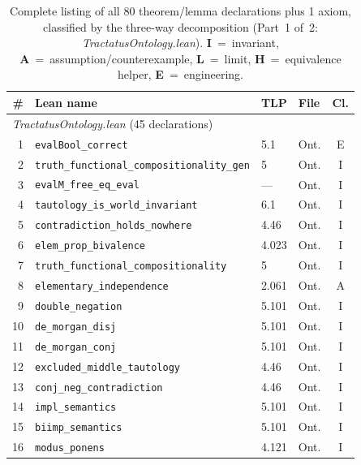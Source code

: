 \documentclass[jsl,bibother]{asl}
\theoremstyle{definition}
\theoremstyle{remark}
\begin{document}
\begin{table}[p]
\centering
\footnotesize
\caption{Complete listing of all 80 theorem/lemma declarations
  plus 1 axiom, classified by the three-way decomposition
  (Part~1 of~2: \emph{TractatusOntology.lean}).
  \textbf{I}~=~invariant, \textbf{A}~=~assumption/counterexample,
  \textbf{L}~=~limit, \textbf{H}~=~equivalence helper,
  \textbf{E}~=~engineering.}
\label{tab:decomposition}
\begin{tabular}{@{}rlllc@{}}
\toprule
\# & \textbf{Lean name} & \textbf{TLP} & \textbf{File} & \textbf{Cl.} \\
\midrule
\multicolumn{5}{l}{\emph{TractatusOntology.lean} (45 declarations)} \\
\midrule
 1 & \texttt{evalBool\_correct}                        & 5.1     & Ont. & E \\
 2 & \texttt{truth\_functional\_compositionality\_gen}  & 5       & Ont. & I \\
 3 & \texttt{evalM\_free\_eq\_eval}                     & ---     & Ont. & I \\
 4 & \texttt{tautology\_is\_world\_invariant}            & 6.1     & Ont. & I \\
 5 & \texttt{contradiction\_holds\_nowhere}              & 4.46    & Ont. & I \\
 6 & \texttt{elem\_prop\_bivalence}                      & 4.023   & Ont. & I \\
 7 & \texttt{truth\_functional\_compositionality}        & 5       & Ont. & I \\
 8 & \texttt{elementary\_independence}                   & 2.061   & Ont. & A \\
 9 & \texttt{double\_negation}                           & 5.101   & Ont. & I \\
10 & \texttt{de\_morgan\_disj}                           & 5.101   & Ont. & I \\
11 & \texttt{de\_morgan\_conj}                           & 5.101   & Ont. & I \\
12 & \texttt{excluded\_middle\_tautology}                & 4.46    & Ont. & I \\
13 & \texttt{conj\_neg\_contradiction}                   & 4.46    & Ont. & I \\
14 & \texttt{impl\_semantics}                            & 5.101   & Ont. & I \\
15 & \texttt{biimp\_semantics}                           & 5.101   & Ont. & I \\
16 & \texttt{modus\_ponens}                              & 4.121   & Ont. & I \\

\end{tabular}
\end{table}
\end{document}
